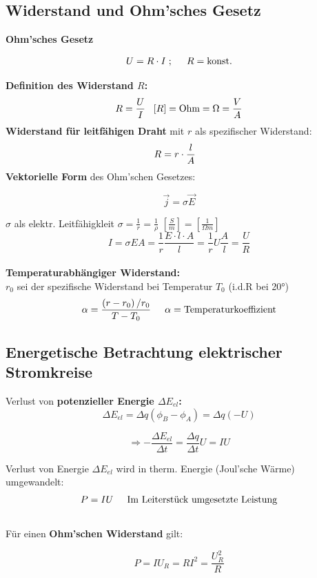 \subsection{Widerstand und Ohm'sches Gesetz}
\textbf{Ohm'sches Gesetz}
\begin{formulabox}
    \[
    U = R \cdot I \hspace{1mm} ; \hspace{5mm} R = \text{konst.}
    \]
\end{formulabox}
\textbf{Definition des Widerstand $R$:}
\[
    R = \frac{U}{I} \hspace{3mm} [R] = \text{Ohm} = \Omega = \frac{V}{A}
\]
\textbf{Widerstand für leitfähigen Draht} mit $r$ als spezifischer Widerstand:
\[
    R = r \cdot \frac{l}{A} \hspace{3mm}
\]
\textbf{Vektorielle Form} des Ohm'schen Gesetzes:
\begin{formulabox}
    \[
        \Vec{j} = \sigma \Vec{E}
    \]
\end{formulabox}
$\sigma$ als elektr. Leitfähigkleit $\sigma = \frac{1}{r} = \frac{1}{\rho}$ \hspace{3mm} $\left[ \frac{S}{m}\right] = \left[ \frac{1}{\Omega m}\right]$
\[
    I = \sigma EA = \frac{1}{r} \frac{E \cdot l \cdot A}{l} = \frac{1}{r} U \frac{A}{l} = \frac{U}{R}
\] \\[1ex]
\textbf{Temperaturabhängiger Widerstand:} \\
$r_0$ sei der spezifische Widerstand bei Temperatur $T_0$ (i.d.R bei 20°)
\[
    \alpha = \frac{\left(r-r_0\right) / r_0}{T - T_0} \hspace{5mm} \alpha = \text{Temperaturkoeffizient}
\]
\subsection{Energetische Betrachtung elektrischer Stromkreise}
Verlust von \textbf{potenzieller Energie $\Delta E_{el}$:}
\[
    \Delta E_{el} = \Delta q \left( \phi_B - \phi_A \right) = \Delta q (-U)
\]
\begin{formulabox}
    \[
    \Rightarrow -\frac{\Delta E_{el}}{\Delta t} = \frac{\Delta q}{\Delta t} U
 = IU    \]
\end{formulabox}
Verlust von Energie $\Delta E_{el}$ wird in therm. Energie (Joul'sche Wärme) umgewandelt:
\\[1ex]
\[
    P = IU \hspace{5mm} \text{Im Leiterstück umgesetzte Leistung}
\] 
\\[1ex]
Für einen \textbf{Ohm'schen Widerstand} gilt:
\begin{formulabox}
    \[
        P = IU_R = RI^2 = \frac{U_R^2}{R}
    \]
\end{formulabox}

